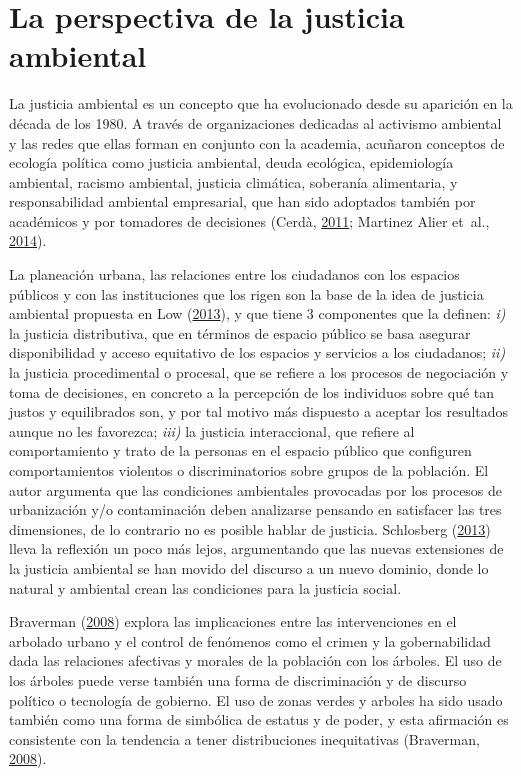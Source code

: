 \documentclass[12pt,a4paper,oneside, openany]{book}
\theoremstyle{definition}
\theoremstyle{definition}
\theoremstyle{definition}
\theoremstyle{remark}
\begin{document}
\section{La perspectiva de la justicia
ambiental}\label{la-perspectiva-de-la-justicia-ambiental}

La justicia ambiental es un concepto que ha evolucionado desde su
aparición en la década de los 1980. A través de organizaciones dedicadas
al activismo ambiental y las redes que ellas forman en conjunto con la
academia, acuñaron conceptos de ecología política como justicia
ambiental, deuda ecológica, epidemiología ambiental, racismo ambiental,
justicia climática, soberanía alimentaria, y responsabilidad ambiental
empresarial, que han sido adoptados también por académicos y por
tomadores de decisiones (Cerdà,
\protect\hyperlink{ref-cerda_origen_2011}{2011}; Martinez Alier et~al.,
\protect\hyperlink{ref-martinez_alier_between_2014}{2014}).

La planeación urbana, las relaciones entre los ciudadanos con los
espacios públicos y con las instituciones que los rigen son la base de
la idea de justicia ambiental propuesta en Low
(\protect\hyperlink{ref-low_public_2013}{2013}), y que tiene 3
componentes que la definen: \emph{i)} la justicia distributiva, que en
términos de espacio público se basa asegurar disponibilidad y acceso
equitativo de los espacios y servicios a los ciudadanos; \emph{ii)} la
justicia procedimental o procesal, que se refiere a los procesos de
negociación y toma de decisiones, en concreto a la percepción de los
individuos sobre qué tan justos y equilibrados son, y por tal motivo más
dispuesto a aceptar los resultados aunque no les favorezca; \emph{iii)}
la justicia interaccional, que refiere al comportamiento y trato de la
personas en el espacio público que configuren comportamientos violentos
o discriminatorios sobre grupos de la población. El autor argumenta que
las condiciones ambientales provocadas por los procesos de urbanización
y/o contaminación deben analizarse pensando en satisfacer las tres
dimensiones, de lo contrario no es posible hablar de justicia.
Schlosberg (\protect\hyperlink{ref-schlosberg_theorising_2013}{2013})
lleva la reflexión un poco más lejos, argumentando que las nuevas
extensiones de la justicia ambiental se han movido del discurso a un
nuevo dominio, donde lo natural y ambiental crean las condiciones para
la justicia social.

Braverman (\protect\hyperlink{ref-braverman_everybody_2008}{2008})
explora las implicaciones entre las intervenciones en el arbolado urbano
y el control de fenómenos como el crimen y la gobernabilidad dada las
relaciones afectivas y morales de la población con los árboles. El uso
de los árboles puede verse también una forma de discriminación y de
discurso político o tecnología de gobierno. El uso de zonas verdes y
arboles ha sido usado también como una forma de simbólica de estatus y
de poder, y esta afirmación es consistente con la tendencia a tener
distribuciones inequitativas (Braverman,
\protect\hyperlink{ref-braverman_everybody_2008}{2008}).
\end{document}
